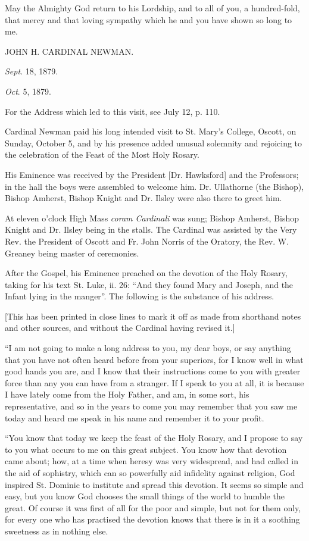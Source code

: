 May the Almighty God return to his Lordship, and to all of you, a
hundred-fold, that mercy and that loving sympathy which he and you
have shown so long to me.

JOHN H. CARDINAL NEWMAN.

\emph{Sept}. 18, 1879.


\emph{Oct}. 5, 1879.

For the Address which led to this visit, see July 12, p. 110.

Cardinal Newman paid his long intended visit to St. Mary's College,
Oscott, on Sunday, October 5, and by his presence added unusual
solemnity and rejoicing to the celebration of the
Feast of the Most Holy Rosary.

His Eminence was received by the President [Dr. Hawksford] and the
Professors; in the hall the boys were assembled to welcome him. Dr.
Ullathorne (the Bishop), Bishop Amherst, Bishop Knight and Dr. Ilsley
were also there to greet him.

At eleven o'clock High Mass \emph{coram Cardinali} was sung; Bishop
Amherst, Bishop Knight and Dr. Ilsley being in the stalls. The
Cardinal was assisted by the Very Rev. the President of Oscott and Fr.
John Norris of the Oratory, the Rev. W. Greaney being master of
ceremonies.

After the Gospel, his Eminence preached on the devotion of the Holy
Rosary, taking for his text St. Luke, ii. 26: ``And they found
Mary and Joseph, and the Infant lying in the manger''. The
following is the substance of his address.


[This has been printed in close lines to mark it off as made from
shorthand notes and other sources, and without the Cardinal having
revised it.]

``I am not going to make a long address to you, my dear boys,
or say anything that you have not often heard before from your
superiors, for I know well in what good hands you are, and I know that
their instructions come to you with greater force than any you can
have from a stranger. If I speak to you at all, it is because I have
lately come from the Holy Father, and am, in some sort, his
representative, and so in the years to come you may remember that you
saw me today and heard me speak in his name and remember it to your
profit.

``You know that today we keep the feast of
the Holy Rosary, and I propose to say to you what occurs to me on this
great subject. You know how that devotion came about; how, at a time
when heresy was very widespread, and had called in the aid of
sophistry, which can so powerfully aid infidelity against religion,
God inspired St. Dominic to institute and spread this devotion. It
seems so simple and easy, but you know God chooses the small things of
the world to humble the great. Of course it was first of all for the
poor and simple, but not for them only, for every one who has
practised the devotion knows that there is in it a soothing sweetness
as in nothing else.

